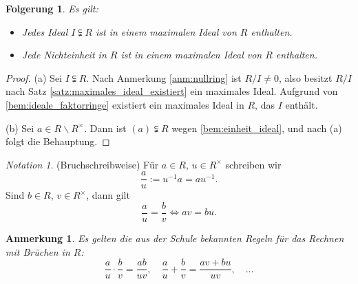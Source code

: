 \documentclass[a4paper, twoside, 11pt, ngerman]{report}
\renewcommand{\setminus}{\smallsetminus}
\theoremstyle{definistyle}
\newtheorem{anm}[satz]{Anmerkung}
\newtheorem{folgerung}[satz]{Folgerung}
\theoremstyle{remark}
\newtheorem*{notation}{Notation}
\begin{document}
\begin{folgerung}\label{folgerung:maximal_ideal_enthalten}
Es gilt:
\begin{itemize}
    \item[(a)] Jedes Ideal $I \subsetneqq R$ ist in einem maximalen Ideal von $R$ enthalten.
    \item[(b)] Jede Nichteinheit in $R$ ist in einem maximalen Ideal von $R$ enthalten.
\end{itemize}
\end{folgerung}

\begin{proof}
(a) Sei $I \subsetneqq R$. Nach Anmerkung \ref{anm:nullring} ist $R / I \neq 0$, also besitzt $R / I$ nach Satz \ref{satz:maximales_ideal_existiert} ein maximales Ideal. Aufgrund von \ref{bem:ideale_faktorringe} existiert ein maximales Ideal in $R$, das $I$ enthält.

(b) Sei $a \in R \setminus R^{\times}$. Dann ist $(a) \subsetneqq R$ wegen \ref{bem:einheit_ideal}, und nach (a) folgt die Behauptung.
\end{proof}



\begin{notation}
(Bruchschreibweise) Für $a \in R$, $u \in R^{\times}$ schreiben wir
\[
\frac{a}{u} := u^{-1} a = a u^{-1}.
\]
Sind $b \in R$, $v \in R^{\times}$, dann gilt
\[
\frac{a}{u} = \frac{b}{v} \iff a v = b u.
\]
\end{notation}

\begin{anm}\label{anm:bruchregeln}
Es gelten die aus der Schule bekannten Regeln für das Rechnen mit Brüchen in $R$:
\[
\frac{a}{u} \cdot \frac{b}{v} = \frac{a b}{u v}, \quad \frac{a}{u} + \frac{b}{v} = \frac{a v + b u}{u v}, \quad \dots
\]
\end{anm}
\end{document}
